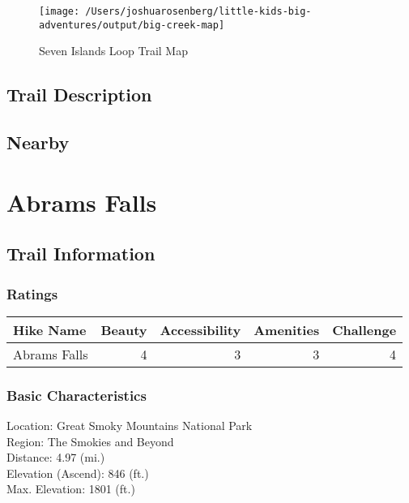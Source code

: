 \documentclass[
]{book}
\begin{document}
\begin{figure}
\texttt{[image: /Users/joshuarosenberg/little-kids-big-adventures/output/big-creek-map]} \caption{Seven Islands Loop Trail Map}\label{fig:unnamed-chunk-51}
\end{figure}

\hypertarget{trail-description-15}{%
\section{Trail Description}\label{trail-description-15}}

\hypertarget{nearby-15}{%
\section{Nearby}\label{nearby-15}}

\hypertarget{abrams-falls}{%
\chapter{Abrams Falls}\label{abrams-falls}}

\hypertarget{trail-information-15}{%
\section{Trail Information}\label{trail-information-15}}

\hypertarget{ratings-11}{%
\subsection{Ratings}\label{ratings-11}}

\begin{tabular}{l|r|r|r|r}
\hline
Hike Name & Beauty & Accessibility & Amenities & Challenge\\
\hline
Abrams Falls & 4 & 3 & 3 & 4\\
\hline
\end{tabular}

\hypertarget{basic-characteristics-15}{%
\subsection{Basic Characteristics}\label{basic-characteristics-15}}

Location: Great Smoky Mountains National Park\\
Region: The Smokies and Beyond\\
Distance: 4.97 (mi.)\\
Elevation (Ascend): 846 (ft.)\\
Max. Elevation: 1801 (ft.)
\end{document}
